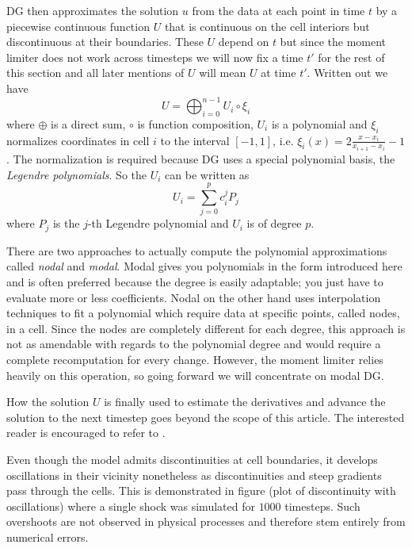 DG then approximates the solution $u$ from the data at each point in time $t$ by a piecewise continuous function $U$ that is continuous on the cell interiors but discontinuous at their boundaries.
These $U$ depend on $t$ but since the moment limiter does not work across timesteps we will now fix a time $t'$ for the rest of this section and all later mentions of $U$ will mean $U$ at time $t'$.
Written out we have
\begin{equation*}
  U = \bigoplus_{i = 0}^{n - 1} U_{i} \circ \xi_{i}
\end{equation*}
where $\oplus$ is a direct sum, $\circ$ is function composition, $U_{i}$ is a polynomial and $\xi_{i}$ normalizes coordinates in cell $i$ to the interval $[-1, 1]$, i.e. $\xi_{i}(x) = 2 \frac{x - x_{i}}{x_{i + 1} - x_{i}} - 1$.
The normalization is required because DG uses a special polynomial basis, the \emph{Legendre polynomials}.
So the $U_{i}$ can be written as
\begin{equation*}
  U_{i} = \sum_{j = 0}^{p} c_{i}^{j} P_{j}
\end{equation*}
where $P_{j}$ is the $j$-th Legendre polynomial and $U_{i}$ is of degree $p$.

There are two approaches to actually compute the polynomial approximations called \emph{nodal} and \emph{modal}.
Modal gives you polynomials in the form introduced here and is often preferred because the degree is easily adaptable; you just have to evaluate more or less coefficients.
Nodal on the other hand uses interpolation techniques to fit a polynomial which require data at specific points, called nodes, in a cell.
Since the nodes are completely different for each degree, this approach is not as amendable with regards to the polynomial degree and would require a complete recomputation for every change.
However, the moment limiter relies heavily on this operation, so going forward we will concentrate on modal DG.

How the solution $U$ is finally used to estimate the derivatives and advance the solution to the next timestep goes beyond the scope of this article.
The interested reader is encouraged to refer to \cite[chapter 3]{Hesthaven2007}.

Even though the model admits discontinuities at cell boundaries, it develops oscillations in their vicinity nonetheless as discontinuities and steep gradients pass through the cells.
This is demonstrated in figure (plot of discontinuity with oscillations) where a single shock was simulated for $1000$ timesteps.
Such overshoots are not observed in physical processes and therefore stem entirely from numerical errors.
